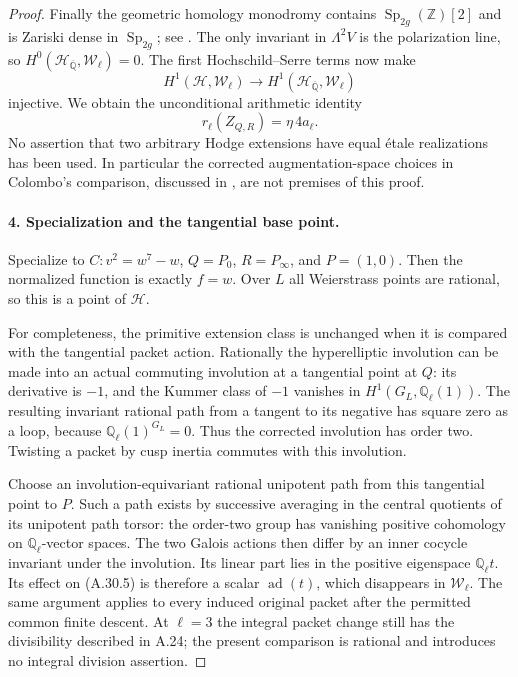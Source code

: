 \begin{proof}
Finally the geometric homology monodromy contains
$\operatorname{Sp}_{2g}(\mathbb Z)[2]$
and is Zariski dense in $\operatorname{Sp}_{2g}$;
see \cite[Theorem 3.6 and Section 4.1]{fghLuoWatanabe}.
The only invariant in $\Lambda^2V$ is the
polarization line, so
$H^0(\mathcal H_{\overline{\mathbb Q}},
\mathcal W_\ell)=0$. The first
Hochschild--Serre terms now make
\[
 H^1(\mathcal H,\mathcal W_\ell)
       \longrightarrow
 H^1(\mathcal H_{\overline{\mathbb Q}},\mathcal W_\ell)
                                                        \tag{A.30.9}
\]
injective. We obtain the unconditional arithmetic
identity
\[
                       r_\ell(Z_{Q,R})=\eta\,4a_\ell.
                                                        \tag{A.30.10}
\]
No assertion that two arbitrary Hodge extensions
have equal \'etale realizations has been used.
In particular the corrected augmentation-space
choices in Colombo's comparison, discussed in
\cite[Introduction and Theorem 4.14]{fghSarkarSreekantan},
are not premises of this proof.

\paragraph{4. Specialization and the tangential base point.}
Specialize to $C:v^2=w^7-w$, $Q=P_0$, $R=P_\infty$,
and $P=(1,0)$. Then the normalized function is
exactly $f=w$. Over $L$ all Weierstrass points
are rational, so this is a point of $\mathcal H$.

For completeness, the primitive extension class
is unchanged when it is compared with the
tangential packet action. Rationally the
hyperelliptic involution can be made into an
actual commuting involution at a tangential
point at $Q$: its derivative is $-1$, and the
Kummer class of $-1$ vanishes in
$H^1(G_L,\mathbb Q_\ell(1))$. The resulting
invariant rational path from a tangent to its
negative has square zero as a loop, because
$\mathbb Q_\ell(1)^{G_L}=0$. Thus the corrected
involution has order two. Twisting a packet
by cusp inertia commutes with this involution.

Choose an involution-equivariant rational
unipotent path from this tangential point to
$P$. Such a path exists by successive
averaging in the central quotients of its
unipotent path torsor: the order-two group
has vanishing positive cohomology on
$\mathbb Q_\ell$-vector spaces. The two
Galois actions then differ by an inner
cocycle invariant under the involution.
Its linear part lies in the positive
eigenspace $\mathbb Q_\ell t$. Its effect
on (A.30.5) is therefore a scalar
$\operatorname{ad}(t)$, which disappears
in $\mathcal W_\ell$.
The same argument applies to every induced
original packet after the permitted common
finite descent. At $\ell=3$ the integral
packet change still has the divisibility
described in A.24; the present comparison
is rational and introduces no integral
division assertion.


\end{proof}
